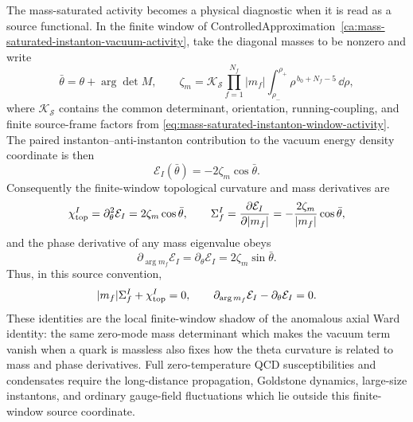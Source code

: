 \begin{controlledapproximation}
\label{ca:mass-saturated-instanton-ward-derivatives}
The mass-saturated activity becomes a physical diagnostic when it is read as a
source functional.  In the finite window of
ControlledApproximation~\ref{ca:mass-saturated-instanton-vacuum-activity},
take the diagonal masses to be nonzero and write
\[
  \bar\theta=\theta+\arg\det M,\qquad
  \zeta_m=\mathcal K_{\mathcal S}
  \prod_{f=1}^{N_f}|m_f|
  \int_{\rho_-}^{\rho_+}\rho^{\,b_0+N_f-5}\,\dd\rho ,
\]
where \(\mathcal K_{\mathcal S}\) contains the common determinant,
orientation, running-coupling, and finite source-frame factors from
\eqref{eq:mass-saturated-instanton-window-activity}.  The paired
instanton--anti-instanton contribution to the vacuum energy density coordinate
is then
\begin{equation}
  \mathcal E_I(\bar\theta)
  =
  -2\zeta_m\cos\bar\theta .
  \label{eq:mass-saturated-instanton-energy-coordinate}
\end{equation}
Consequently the finite-window topological curvature and mass derivatives are
\begin{equation}
  \chi_{\rm top}^{I}
  =
  \partial_\theta^2\mathcal E_I
  =
  2\zeta_m\cos\bar\theta,
  \qquad
  \Sigma_f^{I}
  =
  \frac{\partial\mathcal E_I}{\partial |m_f|}
  =
  -\frac{2\zeta_m}{|m_f|}\cos\bar\theta ,
  \label{eq:mass-saturated-instanton-mass-derivatives}
\end{equation}
and the phase derivative of any mass eigenvalue obeys
\begin{equation}
  \partial_{\arg m_f}\mathcal E_I
  =
  \partial_\theta\mathcal E_I
  =
  2\zeta_m\sin\bar\theta .
  \label{eq:mass-saturated-instanton-phase-derivative}
\end{equation}
Thus, in this source convention,
\begin{equation}
  |m_f|\Sigma_f^{I}+\chi_{\rm top}^{I}=0,
  \qquad
  \partial_{\arg m_f}\mathcal E_I-\partial_\theta\mathcal E_I=0 .
  \label{eq:mass-saturated-instanton-local-ward-relations}
\end{equation}
These identities are the local finite-window shadow of the anomalous axial
Ward identity: the same zero-mode mass determinant which makes the vacuum
term vanish when a quark is massless also fixes how the theta curvature is
related to mass and phase derivatives.  Full zero-temperature QCD
susceptibilities and condensates require the long-distance propagation,
Goldstone dynamics, large-size instantons, and ordinary gauge-field
fluctuations which lie outside this finite-window source coordinate.
\end{controlledapproximation}

